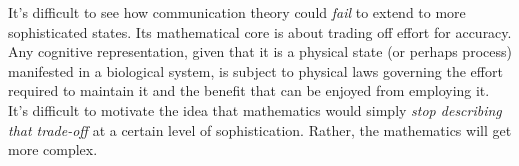 \documentclass[12pt]{article}
\begin{document}
It's difficult to see how communication theory could \textit{fail} to extend to more sophisticated states.
Its mathematical core is about trading off effort for accuracy.
Any cognitive representation, given that it is a physical state (or perhaps process) manifested in a biological system, is subject to physical laws governing the effort required to maintain it and the benefit that can be enjoyed from employing it.
It's difficult to motivate the idea that mathematics would simply \textit{stop describing that trade-off} at a certain level of sophistication.
Rather, the mathematics will get more complex.

\printbibliography
\end{document}
